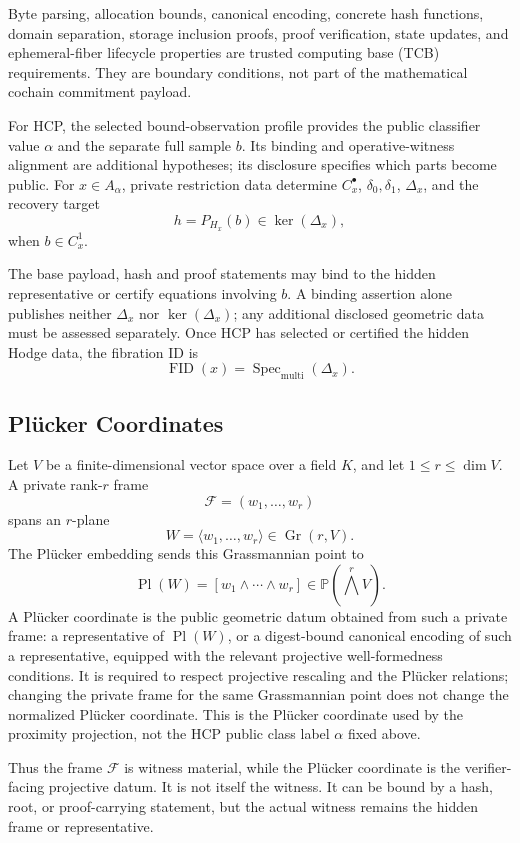 Byte parsing, allocation bounds, canonical encoding, concrete hash functions,
domain separation, storage inclusion proofs, proof verification, state updates,
and ephemeral-fiber lifecycle properties are trusted computing base (TCB)
requirements. They are boundary
conditions, not part of the mathematical cochain commitment payload.

For HCP, the selected bound-observation profile provides the public classifier
value \(\alpha\) and the separate full sample \(b\). Its binding and
operative-witness alignment are additional hypotheses; its disclosure
specifies which parts become public.
For \(x\in A_\alpha\), private restriction data determine \(C_x^\bullet\),
\(\delta_0,\delta_1\), \(\Delta_x\), and the recovery target
\[
  h=P_{H_x}(b)\in\ker(\Delta_x),
\]
when \(b\in C_x^1\).

The base payload, hash and proof statements may bind to the hidden
representative or certify equations involving \(b\). A binding assertion
alone publishes neither \(\Delta_x\) nor \(\ker(\Delta_x)\);
any additional disclosed geometric data must be assessed separately.
Once HCP has selected or
certified the hidden Hodge data, the fibration ID is
\[
  \operatorname{FID}(x)=\operatorname{Spec}_{\mathrm{multi}}(\Delta_x).
\]

\subsection{Pl\"ucker Coordinates}

Let \(V\) be a finite-dimensional vector space over a field \(K\), and let
\(1\le r\le \dim V\). A private rank-\(r\) frame
\[
  \mathcal F=(w_1,\ldots,w_r)
\]
spans an \(r\)-plane
\[
  W=\langle w_1,\ldots,w_r\rangle\in \operatorname{Gr}(r,V).
\]
The Pl\"ucker embedding sends this Grassmannian point to
\[
  \operatorname{Pl}(W)
  =
  [w_1\wedge\cdots\wedge w_r]
  \in \mathbb P(\bigwedge^r V).
\]
A Pl\"ucker coordinate is the public geometric datum obtained from such a private
frame: a representative of \(\operatorname{Pl}(W)\), or a digest-bound
canonical encoding of such a representative, equipped with the relevant
projective well-formedness conditions. It is required to respect projective
rescaling and the Pl\"ucker relations; changing the private frame for the same
Grassmannian point does not change the normalized Pl\"ucker coordinate.
This is the Pl\"ucker coordinate used by the proximity projection, not the HCP
public class label \(\alpha\) fixed above.

Thus the frame \(\mathcal F\) is witness material, while the Pl\"ucker coordinate is the
verifier-facing projective datum. It is not itself the witness. It can be bound
by a hash, root, or proof-carrying statement, but the actual witness remains
the hidden frame or representative.

